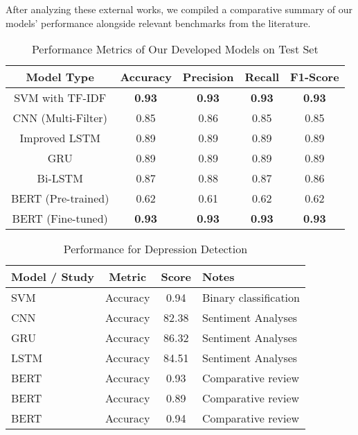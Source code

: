 After analyzing these external works, we compiled a comparative summary of our models' performance alongside relevant benchmarks from the literature.

\begin{table}[H]
\centering
\caption{Performance Metrics of Our Developed Models on Test Set}
\begin{tabular}{||c|c|c|c|c||}
\hline
\textbf{Model Type} & \textbf{Accuracy} & \textbf{Precision} & \textbf{Recall} & \textbf{F1-Score} \\
\hline \hline
SVM with TF-IDF & \textbf{0.93} & \textbf{0.93} & \textbf{0.93} & \textbf{0.93} \\
\hline
CNN (Multi-Filter) & 0.85 & 0.86 & 0.85 & 0.85 \\
\hline
Improved LSTM & 0.89 & 0.89 & 0.89 & 0.89 \\
\hline
GRU & 0.89 & 0.89 & 0.89 & 0.89 \\
\hline
Bi-LSTM & 0.87 & 0.88 & 0.87 & 0.86 \\
\hline
BERT (Pre-trained) & 0.62 & 0.61 & 0.62 & 0.62 \\
\hline
BERT (Fine-tuned) & \textbf{0.93} & \textbf{0.93} & \textbf{0.93} & \textbf{0.93} \\
\hline
\end{tabular}
\label{tab:our_models_results}
\end{table}

\begin{table}[H]
\centering
\caption{Performance for Depression Detection}
\begin{tabular}{||l|c|c|l||}
\hline
\textbf{Model / Study} & \textbf{Metric} & \textbf{Score} & \textbf{Notes} \\
\hline \hline
SVM~\cite{costa2021image} & Accuracy & 0.94 & Binary classification \\
\hline
CNN~\cite{zhou2017systematic} & Accuracy & 82.38 & Sentiment Analyses \\
GRU~\cite{zhou2017systematic} & Accuracy & 86.32 & Sentiment Analyses \\
LSTM~\cite{zhou2017systematic} & Accuracy & 84.51 & Sentiment Analyses \\
\hline
BERT~\cite{prabhakar2024sentiment} & Accuracy & 0.93 & Comparative review \\
BERT~\cite{prabhakar2024sentiment} & Accuracy & 0.89 & Comparative review \\
BERT~\cite{prabhakar2024sentiment} & Accuracy & 0.94 & Comparative review \\
\hline
\end{tabular}
\label{tab:sentic_models_simple}
\end{table}

